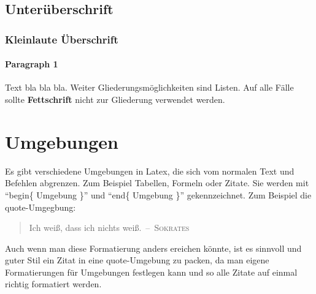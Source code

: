 	\subsection{Unterüberschrift}
	
		\subsubsection{Kleinlaute Überschrift}
		
			\paragraph{Paragraph 1}	%
			Text bla bla bla. Weiter Gliederungsmöglichkeiten sind Listen. Auf alle Fälle sollte \textbf{Fettschrift} nicht zur Gliederung verwendet werden.


\section{Umgebungen}
Es gibt verschiedene Umgebungen in Latex, die sich vom normalen Text und Befehlen abgrenzen. 
Zum Beispiel Tabellen, Formeln oder Zitate. Sie werden mit ``begin\{ Umgebung \}'' und ``end\{ Umgebung \}'' gekennzeichnet. 
Zum Beispiel die quote-Umgegbung:
\begin{quote}
	\glqq Ich weiß, dass ich nichts weiß.\grqq \ --\ \textsc{Sokrates}				%
\end{quote}
Auch wenn man diese Formatierung anders ereichen könnte, 
ist es sinnvoll und guter Stil ein Zitat in eine quote-Umgebung zu packen, 
da man eigene Formatierungen für Umgebungen festlegen kann und so alle Zitate auf einmal richtig formatiert werden.


